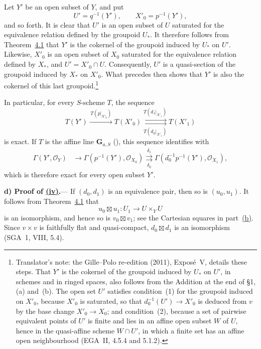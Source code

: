 
Let \(Y'\) be an open subset of \(Y\), and put
\[
  U'=q^{-1}(Y'),\qquad X'_0=p^{-1}(Y'),
\]
and so forth. It is clear that \(U'\) is an open subset of \(U\) saturated for
the equivalence relation defined by the groupoid \(U_\ast\). It therefore
follows from Theorem~\hyperref[thm:sga3-V-4.1]{4.1} that \(Y'\) is the cokernel of the groupoid
induced by \(U_\ast\) on \(U'\). Likewise, \(X'_0\) is an open subset of \(X_0\)
saturated for the equivalence relation defined by \(X_\ast\), and
\(U'=X'_0\cap U\). Consequently, \(U'\) is a quasi-section of the groupoid
induced by \(X_\ast\) on \(X'_0\). What precedes then shows that \(Y'\) is also
the cokernel of this last groupoid.\footnote{Translator's note: the Gille--Polo re-edition (2011), Exposé~V, details
these steps. That \(Y'\) is the cokernel of the groupoid induced by \(U_\ast\)
on \(U'\), in schemes and in ringed spaces, also follows from the Addition at
the end of \S1, (a) and~(b). The open set \(U'\) satisfies condition~(1) for
the groupoid induced on \(X'_0\), because \(X'_0\) is saturated, so that
\(d_0^{-1}(U')\to X'_0\) is deduced from \(v\) by the base change
\(X'_0\to X_0\); and condition~(2), because a set of pairwise equivalent points
of \(U'\) is finite and lies in an affine open subset \(W\) of \(U\), hence in the
quasi-affine scheme \(W\cap U'\), in which a finite set has an affine open
neighbourhood (EGA~II, 4.5.4 and 5.1.2).}

In particular, for every \(S\)-scheme \(T\), the sequence
\begin{equation}
  T(Y')
  \xrightarrow{\,T(p|_{X'_0})\,}
  T(X'_0)
  \underset{T(d_0|_{X'_1})}
    {\overset{T(d_1|_{X'_1})}{\rightrightarrows}}
  T(X'_1)
  \label{eq:sga3-V-6.1-T-exact}
\end{equation}
is exact. If \(T\) is the affine line \(\mathbf G_{a,S}\)
(), this sequence identifies with
\begin{equation}
\begin{aligned}
  \Gamma(Y',\mathcal O_Y)
  &\longrightarrow
  \Gamma(p^{-1}(Y'),\mathcal O_{X_0})
  \underset{\delta_0}{\overset{\delta_1}{\rightrightarrows}}
  \Gamma(d_0^{-1}p^{-1}(Y'),\mathcal O_{X_1}),
\end{aligned}
\label{eq:sga3-V-6.1-sections-exact}
\end{equation}
which is therefore exact for every open subset \(Y'\).

\medskip
{}\label{par:sga3-V-6-d}%
\noindent\textbf{d) Proof of \hyperref[lem:sga3-V-6.1-iv]{(iv)}.}---%
If \((d_0,d_1)\) is an equivalence pair, then so is
\((u_0,u_1)\). It follows from
Theorem~\hyperref[thm:sga3-V-4.1]{4.1} that
\[
  u_0\boxtimes u_1:U_1\longrightarrow U\times_Y U
\]
is an isomorphism, and hence so is \(v_0\boxtimes v_1\); see the
Cartesian squares in part~\hyperref[par:sga3-V-6-b]{(b)}. Since
\(v\times v\) is faithfully flat and quasi-compact,
\(d_0\boxtimes d_1\) is an isomorphism (SGA~1, VIII, 5.4).

